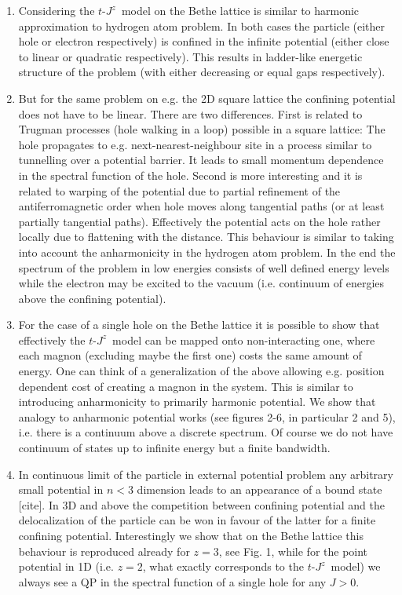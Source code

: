 \documentclass[%
 reprint,
 amsmath,amssymb,
 aps,
prb,
floatfix,
]{revtex4-1}
\begin{document}
\begin{enumerate}[1.]
\item Considering the $t$-$J^z$~model on the Bethe lattice is similar to harmonic approximation to hydrogen atom problem. In both cases the particle (either hole or electron respectively) is confined in the infinite potential (either close to linear or quadratic respectively). This results in ladder-like energetic structure of the problem (with either decreasing or equal gaps respectively).

\item But for the same problem on e.g. the 2D square lattice the confining potential does not have to be linear. There are two differences. First is related to Trugman processes (hole walking in a loop) possible in a square lattice: The hole propagates to e.g. next-nearest-neighbour site in a process similar to tunnelling over a potential barrier. It leads to small momentum dependence in the spectral function of the hole. Second is more interesting and it is related to warping of the potential due to partial refinement of the antiferromagnetic order when hole moves along tangential paths (or at least partially tangential paths). Effectively the potential acts on the hole rather locally due to flattening with the distance. This behaviour is similar to  taking into account the anharmonicity in the hydrogen atom problem. In the end the spectrum of the problem in low energies consists of well defined energy levels while the electron may be excited to the vacuum (i.e. continuum of energies above the confining potential).

\item For the case of a single hole on the Bethe lattice it is possible to show that effectively the $t$-$J^z$~model can be mapped onto non-interacting one, where each magnon (excluding maybe the first one) costs the same amount of energy. One can think of a generalization of the above allowing e.g. position dependent cost of creating a magnon in the system. This is similar to introducing anharmonicity to primarily harmonic potential. We show that analogy to anharmonic potential works (see figures 2-6, in particular 2 and 5), i.e. there is a continuum above a discrete spectrum. Of course we do not have continuum of states up to infinite energy but a finite bandwidth.

\item In continuous limit of the particle in external potential problem any arbitrary small potential in $n < 3$ dimension leads to an appearance of a bound state [cite]. In 3D and above the competition between confining potential and the delocalization of the particle can be won in favour of the latter for a finite confining potential. Interestingly we show that on the Bethe lattice this behaviour is reproduced already for $z = 3$, see Fig. 1, while for the point potential in 1D (i.e. $z = 2$, what exactly corresponds to the $t$-$J^z$~model) we always see a QP in the spectral function of a single hole for any $J > 0$.  
\end{enumerate}
\end{document}
